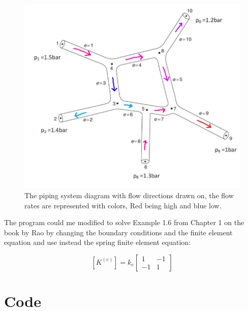 \documentclass{article}
\begin{document}
\begin{figure}[h]
    \centering
    \includegraphics[width=\textwidth]{HW1/PaintResults.png}
    \caption{The piping system diagram with flow directions drawn on, the flow rates are represented with colors, Red being high and blue low.}
    \label{hw1:fig:flows}
\end{figure}

The program could me modified to solve Example 1.6 from Chapter 1 on the book by Rao by changing the boundary conditions and the finite element equation and use instead the spring finite element equation:

$$\left[K^{(e)}\right]=k_e\left[\begin{array}{rr}
1 & -1 \\
-1 & 1 
\end{array}\right] $$

\newpage
\appendix
\section{Code}

\end{document}
